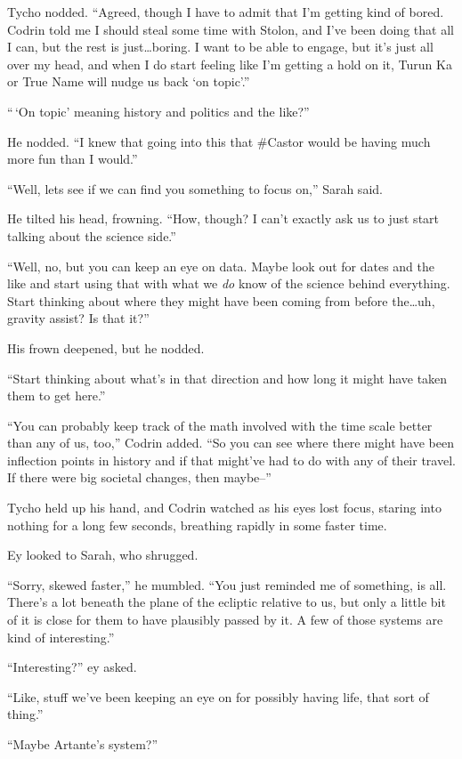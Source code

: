 Tycho nodded. ``Agreed, though I have to admit that I'm getting kind of bored. Codrin told me I should steal some time with Stolon, and I've been doing that all I can, but the rest is just\ldots boring. I want to be able to engage, but it's just all over my head, and when I do start feeling like I'm getting a hold on it, Turun Ka or True Name will nudge us back `on topic'.''

``\,`On topic' meaning history and politics and the like?''

He nodded. ``I knew that going into this that \#Castor would be having much more fun than I would.''

``Well, lets see if we can find you something to focus on,'' Sarah said.

He tilted his head, frowning. ``How, though? I can't exactly ask us to just start talking about the science side.''

``Well, no, but you can keep an eye on data. Maybe look out for dates and the like and start using that with what we \emph{do} know of the science behind everything. Start thinking about where they might have been coming from before the\ldots uh, gravity assist? Is that it?''

His frown deepened, but he nodded.

``Start thinking about what's in that direction and how long it might have taken them to get here.''

``You can probably keep track of the math involved with the time scale better than any of us, too,'' Codrin added. ``So you can see where there might have been inflection points in history and if that might've had to do with any of their travel. If there were big societal changes, then maybe--''

Tycho held up his hand, and Codrin watched as his eyes lost focus, staring into nothing for a long few seconds, breathing rapidly in some faster time.

Ey looked to Sarah, who shrugged.

``Sorry, skewed faster,'' he mumbled. ``You just reminded me of something, is all. There's a lot beneath the plane of the ecliptic relative to us, but only a little bit of it is close for them to have plausibly passed by it. A few of those systems are kind of interesting.''

``Interesting?'' ey asked.

``Like, stuff we've been keeping an eye on for possibly having life, that sort of thing.''

``Maybe Artante's system?''

